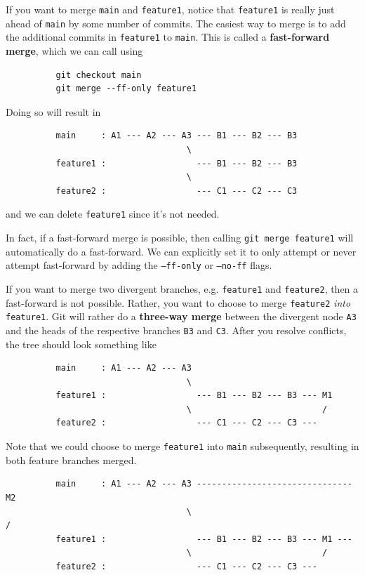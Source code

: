 \documentclass{article}
\begin{document}
      \begin{definition}
        If you want to merge \texttt{main} and \texttt{feature1}, notice that \texttt{feature1} is really just ahead of \texttt{main} by some number of commits. The easiest way to merge is to add the additional commits in \texttt{feature1} to \texttt{main}. This is called a \textbf{fast-forward merge}, which we can call using 
        \begin{lstlisting}
          git checkout main 
          git merge --ff-only feature1
        \end{lstlisting} 
        Doing so will result in 
        \begin{lstlisting}
          main     : A1 --- A2 --- A3 --- B1 --- B2 --- B3
                                    \
          feature1 :                  --- B1 --- B2 --- B3
                                    \
          feature2 :                  --- C1 --- C2 --- C3
        \end{lstlisting}
        and we can delete \texttt{feature1} since it's not needed. 
      \end{definition}

      In fact, if a fast-forward merge is possible, then calling \texttt{git merge feature1} will automatically do a fast-forward. We can explicitly set it to only attempt or never attempt fast-forward by adding the \texttt{--ff-only} or \texttt{--no-ff} flags. 

      \begin{definition}
        If you want to merge two divergent branches, e.g. \texttt{feature1} and \texttt{feature2}, then a fast-forward is not possible. Rather, you want to choose to merge \texttt{feature2} \textit{into} \texttt{feature1}. Git will rather do a \textbf{three-way merge} between the divergent node \texttt{A3} and the heads of the respective branches \texttt{B3} and \texttt{C3}. After you resolve conflicts, the tree should look something like 
        \begin{lstlisting}
          main     : A1 --- A2 --- A3
                                    \
          feature1 :                  --- B1 --- B2 --- B3 --- M1
                                    \                          /
          feature2 :                  --- C1 --- C2 --- C3 ---
        \end{lstlisting}
        Note that we could choose to merge \texttt{feature1} into \texttt{main} subsequently, resulting in both feature branches merged. 
        \begin{lstlisting}
          main     : A1 --- A2 --- A3 ------------------------------- M2
                                    \                                 /
          feature1 :                  --- B1 --- B2 --- B3 --- M1 ---
                                    \                          /
          feature2 :                  --- C1 --- C2 --- C3 ---
        \end{lstlisting}
      \end{definition}
\end{document}
